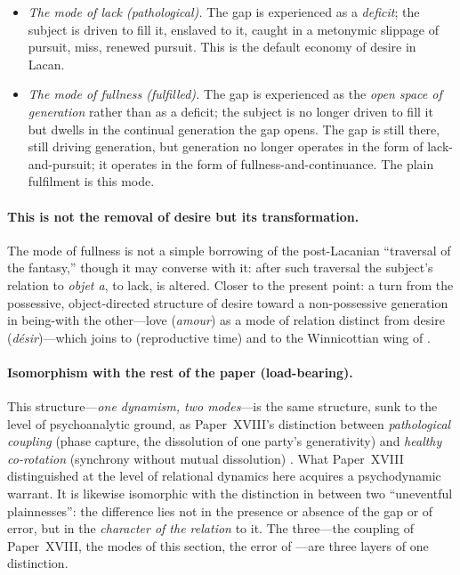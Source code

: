 \begin{itemize}
  \item \emph{The mode of lack (pathological).} The gap is experienced as a \emph{deficit}; the subject is driven to fill it, enslaved to it, caught in a metonymic slippage of pursuit, miss, renewed pursuit. This is the default economy of desire in Lacan.
  \item \emph{The mode of fullness (fulfilled).} The gap is experienced as the \emph{open space of generation} rather than as a deficit; the subject is no longer driven to fill it but dwells in the continual generation the gap opens. The gap is still there, still driving generation, but generation no longer operates in the form of lack-and-pursuit; it operates in the form of fullness-and-continuance. The plain fulfilment is this mode.
\end{itemize}

\paragraph{This is not the removal of desire but its transformation.} The mode of fullness is not a simple borrowing of the post-Lacanian ``traversal of the fantasy,'' though it may converse with it: after such traversal the subject's relation to \emph{objet a}, to lack, is altered. Closer to the present point: a turn from the possessive, object-directed structure of desire toward a non-possessive generation in being-with the other---love (\emph{amour}) as a mode of relation distinct from desire (\emph{désir})---which joins to  (reproductive time) and to the Winnicottian wing of .

\paragraph{Isomorphism with the rest of the paper (load-bearing).} This structure---\emph{one dynamism, two modes}---is the same structure, sunk to the level of psychoanalytic ground, as Paper~XVIII's distinction between \emph{pathological coupling} (phase capture, the dissolution of one party's generativity) and \emph{healthy co-rotation} (synchrony without mutual dissolution) \parencite{paperxvii}. What Paper~XVIII distinguished at the level of relational dynamics here acquires a psychodynamic warrant. It is likewise isomorphic with the distinction in  between two ``uneventful plainnesses'': the difference lies not in the presence or absence of the gap or of error, but in the \emph{character of the relation} to it. The three---the coupling of Paper~XVIII, the modes of this section, the error of ---are three layers of one distinction.

